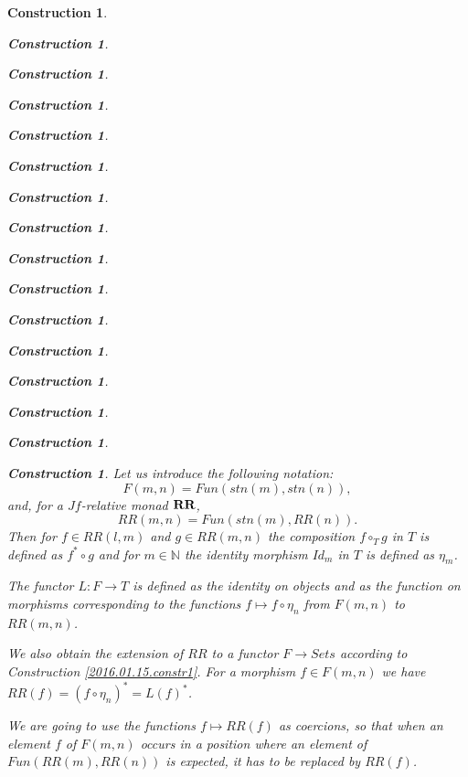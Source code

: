 \documentclass[onecolumn,12pt]{amsart}
\numberwithin{proposition}{subsection}
\newtheorem{construction}[proposition]{Construction}
\newcommand{\sr}{\rightarrow}
\newcommand{\nn}{{\mathbb N}}
\newcommand{\nat}{\nn}
\newcommand{\mbind}[1]{{#1^*}}
\newcommand{\hc}{\circ_{T}}
\newcommand{\RR}{{\bf RR}}
\begin{document}
\begin{construction}
\begin{construction}
\begin{construction}
\begin{construction}
\begin{construction}
\begin{construction}
\begin{construction}
\begin{construction}
\begin{construction}
\begin{construction}
\begin{construction}
\begin{construction}
\begin{construction}
\begin{construction}
\begin{construction}
\begin{construction}
Let us introduce the following notation:
%
$$F(m,n)=Fun(stn(m),stn(n)),$$
%
and, for a $Jf$-relative monad $\RR$,
%
$$RR(m,n)=Fun(stn(m),RR(n)).$$
%
Then for $f\in RR(l,m)$ and $g\in RR(m,n)$ the composition $f\hc g$ in $T$ is
defined as $\mbind{f}\circ g$ and for $m\in\nat$ the identity morphism $Id_m$
in $T$ is defined as $\eta_{m}$.

The functor $L:F\sr T$ is defined as the identity on objects and as the
function on morphisms corresponding to the functions $f\mapsto f\circ \eta_{n}$
from $F(m,n)$ to $RR(m,n)$.

We also obtain the extension of $RR$ to a functor $F\sr Sets$ according to
Construction \ref{2016.01.15.constr1}. For a morphism $f\in F(m,n)$ we have
$RR(f)=\mbind{(f\circ \eta_{n})}=\mbind{L(f)}$.

We are going to use the functions $f\mapsto RR(f)$ as coercions, so that when an
element $f$ of $F(m,n)$ occurs in a position where an element of
$Fun(RR(m),RR(n))$ is expected, it has to be replaced by $RR(f)$.


\end{construction}
\end{construction}
\end{construction}
\end{construction}
\end{construction}
\end{construction}
\end{construction}
\end{construction}
\end{construction}
\end{construction}
\end{construction}
\end{construction}
\end{construction}
\end{construction}
\end{construction}
\end{construction}
\end{document}
